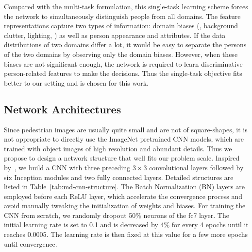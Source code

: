 Compared with the multi-task formulation, this single-task learning scheme forces the network to simultaneously distinguish people from all domains. The feature representations capture two types of information: domain biases (\eg, background clutter, lighting, \etc) as well as person appearance and attributes. If the data distributions of two domains differ a lot, it would be easy to separate the persons of the two domains by observing only the domain biases. However, when these biases are not significant enough, the network is required to learn discriminative person-related features to make the decisions. Thus the single-task objective fits better to our setting and is chosen for this work.

\subsection{Network Architectures} %
\label{sub:md-network-arch}
Since pedestrian images are usually quite small and are not of square-shapes, it is not appropriate to directly use the ImageNet pretrained CNN models, which are trained with object images of high resolution and abundant details. Thus we propose to design a network structure that well fits our problem scale. Inspired by~\cite{ioffe2015batch,simonyan2014very}, we build a CNN with three preceding $3\times 3$ convolutional layers followed by six Inception modules and two fully connected layers. Detailed structures are listed in Table~\ref{tab:md-cnn-structure}. The Batch Normalization (BN) layers are employed before each ReLU layer, which accelerate the convergence process and avoid manually tweaking the initialization of weights and biases. For training the CNN from scratch, we randomly dropout 50\% neurons of the fc7 layer. The initial learning rate is set to 0.1 and is decreased by 4\% for every 4 epochs until it reaches 0.0005. The learning rate is then fixed at this value for a few more epochs until convergence.

